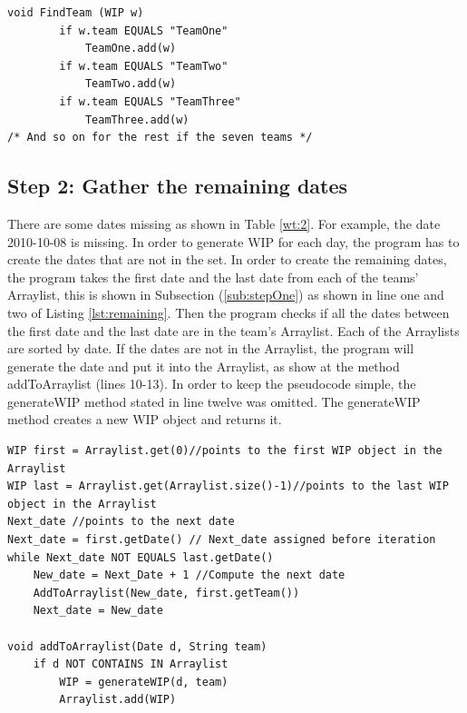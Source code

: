 \documentclass[UKenglish]{ifimaster}  %
\begin{document}
 
 \begin{lstlisting}[caption={Gather WIP object to the right data structure},label={lst:addWIP}]
void FindTeam (WIP w) 
		if w.team EQUALS "TeamOne"
			TeamOne.add(w)
		if w.team EQUALS "TeamTwo"
			TeamTwo.add(w)
		if w.team EQUALS "TeamThree"
			TeamThree.add(w)			
/* And so on for the rest if the seven teams */
 \end{lstlisting}
 
 \newpage
\subsection{Step 2: Gather the remaining dates}
 \label{sub:stepTwo}
There are some dates missing as shown in Table \ref{wt:2}. For example, the date 2010-10-08 is missing. In order to generate WIP for each day, the program has to create the dates that are not in the set. In order to create the remaining dates, the program takes the first date and the last date from each of the teams' Arraylist, this is shown in Subsection (\ref{sub:stepOne}) as shown in line one and two of Listing \ref{lst:remaining}. Then the program checks if all the dates between the first date and the last date are in the team's Arraylist. Each of the Arraylists are sorted by date. If the dates are not in the Arraylist, the program will generate the date and put it into the Arraylist, as show at the method addToArraylist (lines 10-13).
In order to keep the pseudocode simple, the generateWIP method stated in line twelve was omitted. The generateWIP method creates a new WIP object and returns it.



\begin{lstlisting}[caption={Gather the remaining dates.},label={lst:remaining}]
WIP first = Arraylist.get(0)//points to the first WIP object in the Arraylist 
WIP last = Arraylist.get(Arraylist.size()-1)//points to the last WIP object in the Arraylist 
Next_date //points to the next date
Next_date = first.getDate() // Next_date assigned before iteration
while Next_date NOT EQUALS last.getDate()
	New_date = Next_Date + 1 //Compute the next date
	AddToArraylist(New_date, first.getTeam())
	Next_date = New_date

void addToArraylist(Date d, String team)
	if d NOT CONTAINS IN Arraylist
		WIP = generateWIP(d, team)
		Arraylist.add(WIP) 
 \end{lstlisting}
\end{document}
